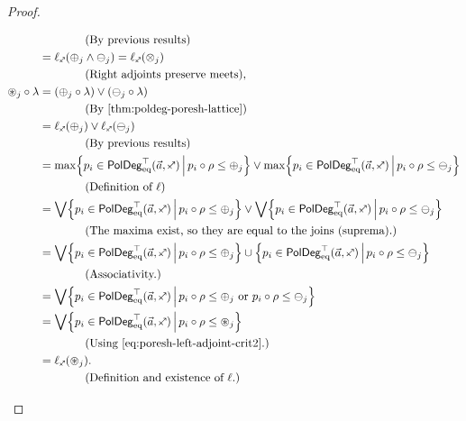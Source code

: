 \documentclass[a4paper]{memoir}
\begin{document}
\begin{proof}
\begin{enumerate}
\begin{itemize}
\begin{align*}
				& \qquad \qquad \text{(By previous results)} \\
				&= \ell_\ypolar(\pospol_j \wedge \negpol_j) = \ell_\ypolar(\mixpol_j) \\
				& \qquad \qquad \text{(Right adjoints preserve meets),} \\
				\isopol_j \circ \lambda
				&= (\pospol_j \circ \lambda) \vee (\negpol_j \circ \lambda) \\
				& \qquad \qquad \text{(By \cref{thm:poldeg-poresh-lattice})} \\
				&= \ell_\ypolar(\pospol_j) \vee \ell_\ypolar(\negpol_j) \\
				& \qquad \qquad \text{(By previous results)} \\
				&= \max \set{p_i \in \poldegeqtop(\vec a, \ypolar)}{p_i \circ \rho \leq \pospol_j} \vee \max \set{p_i \in \poldegeqtop(\vec a, \ypolar)}{p_i \circ \rho \leq \negpol_j} \\
				& \qquad \qquad \text{(Definition of $\ell$)} \\
				&= \bigvee \set{p_i \in \poldegeqtop(\vec a, \ypolar)}{p_i \circ \rho \leq \pospol_j} \vee \bigvee \set{p_i \in \poldegeqtop(\vec a, \ypolar)}{p_i \circ \rho \leq \negpol_j} \\
				& \qquad \qquad \text{(The maxima exist, so they are equal to the joins (suprema).)} \\
				&= \bigvee \set{p_i \in \poldegeqtop(\vec a, \ypolar)}{p_i \circ \rho \leq \pospol_j} \cup \set{p_i \in \poldegeqtop(\vec a, \ypolar)}{p_i \circ \rho \leq \negpol_j} \\
				& \qquad \qquad \text{(Associativity.)} \\
				&= \bigvee \set{p_i \in \poldegeqtop(\vec a, \ypolar)}{p_i \circ \rho \leq \pospol_j \text{ or } p_i \circ \rho \leq \negpol_j} \\
				&= \bigvee \set{p_i \in \poldegeqtop(\vec a, \ypolar)}{p_i \circ \rho \leq \isopol_j} \\
				& \qquad \qquad \text{(Using \cref{eq:poresh-left-adjoint-crit2}.)} \\
				&= \ell_\ypolar(\isopol_j). \\
				& \qquad \qquad \text{(Definition and existence of $\ell$.)}
			\end{align*}
		\end{itemize}
		

\end{enumerate}
\end{proof}
\end{document}
